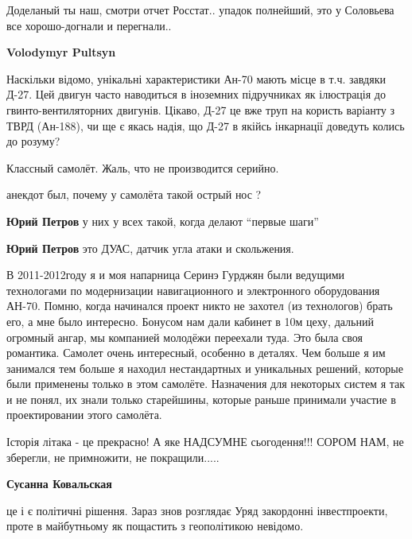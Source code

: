 \begin{itemize}
\begin{itemize}
\begin{itemize}
Доделаный ты наш, смотри отчет Росстат.. упадок полнейший, это у Соловьева все
хорошо-догнали и перегнали..

\end{itemize} %

\textbf{Volodymyr Pultsyn} 

Наскільки відомо, унікальні характеристики Ан-70 мають місце в т.ч. завдяки
Д-27. Цей двигун часто наводиться в іноземних підручниках як ілюстрація до
гвинто-вентиляторних двигунів. Цікаво, Д-27 це вже труп на користь варіанту з
ТВРД (Ан-188), чи ще є якась надія, що Д-27 в якійсь інкарнації доведуть колись
до розуму?

\end{itemize} %

Классный самолёт. Жаль, что не производится серийно.

анекдот был, почему у самолёта такой острый нос ?

\begin{itemize} %
\textbf{Юрий Петров} у них у всех такой, когда делают \enquote{первые шаги}

\textbf{Юрий Петров} это ДУАС, датчик угла атаки и скольжения.
\end{itemize} %


В 2011-2012году я и моя напарница Серинэ Гурджян были ведущими технологами по
модернизации навигационного и электронного оборудования АН-70. Помню, когда
начинался проект никто не захотел (из технологов) брать его, а мне было
интересно. Бонусом нам дали кабинет в 10м цеху, дальний огромный ангар, мы
компанией молодёжи переехали туда. Это была своя романтика. Самолет очень
интересный, особенно в деталях. Чем больше я им занимался тем больше я находил
нестандартных и уникальных решений, которые были применены только в этом
самолёте. Назначения для некоторых систем я так и не понял, их знали только
старейшины, которые раньше принимали участие в проектировании этого самолёта.


Історія літака - це прекрасно! А яке НАДСУМНЕ сьогодення!!! СОРОМ НАМ, не
зберегли, не примножити, не покращили.....

\textbf{Сусанна Ковальская} 

це і є політичні рішення. Зараз знов розглядає Уряд закордонні інвестпроекти,
проте в майбутньому як пощастить з геополітикою невідомо.

\end{itemize} %


